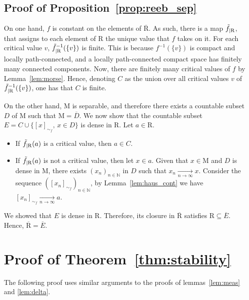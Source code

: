 \documentclass[pdflatex,sn-mathphys-ay]{sn-jnl}%
\newcommand{\reeb}{\mathrm{R}}
\newcommand{\man}{\mathrm{M}}
\newcommand{\converge}{\underset{n\rightarrow\infty}{\longrightarrow}}
\newcommand{\N}{\mathbb{N}}
\newcommand{\preim}[2]{#1^{-1}(#2)}
\newcommand{\change}[1]{\noindent #1}
\theoremstyle{thmstyleone}%
\begin{document}
\begin{appendices}
\subsection{Proof of Proposition~\ref{prop:reeb_sep}}

On one hand, $f$ is constant on the elements of $\overline{\reeb}$. As such, there is a map $\Tilde{f}_{|\reeb}$, that assigns to each element of $\reeb$ the unique value that $f$ takes on it. 
For each critical value $v$, $\preim{\Tilde{f}_{|\reeb}}{\{v\}}$ is finite. This is because $\preim{f}{\{v\}}$ is compact  and locally path-connected, and a locally path-connected compact space has finitely many connected components. 
Now, there are finitely many critical values of $f$ by Lemma~\ref{lem:morse}. Hence, denoting $C$ \change{as} the union over all critical values $v$ of $\preim{\Tilde{f}_{|\reeb}}{\{v\}}$, one has that $C$ is finite. 

On the other hand, $\man$ is separable, and therefore there exists a countable subset $D$ of $\man$ such that $\man=\overline{D}$. We now show that the countable subset $E=C\cup \{[x]_{\sim_f},\,x\in D\}$ is dense in $\reeb$. Let $a\in\reeb$. 
\begin{itemize}
	\item If $\Tilde{f}_{|\reeb}(a)$ is a critical value, then $a\in C$.
	\item If $\Tilde{f}_{|\reeb}(a)$ is not a critical value, then let $x\in a$. Given that $x\in\man$ and $D$ is dense in $\man$, there exists $(x_n)_{n\in\N}$ in $D$ such that $x_n\converge x$. Consider the sequence $([x_n]_{\sim_f})_{n\in\N}$, by Lemma~\ref{lem:haus_cont} we have $[x_n]_{\sim_f}\converge a$.
\end{itemize}  

We showed that $E$ is dense in $\reeb$. Therefore, its closure in $\overline{\reeb}$ satisfies $\reeb\subseteq\overline{E}$. Hence, $\overline{\reeb}=\overline{E}$.



\section{Proof of Theorem~\ref{thm:stability}}\label{apdx:stab_proof}

The following proof uses similar arguments to the proofs of lemmas~\ref{lem:meas} and \ref{lem:delta}.


\end{appendices}
\end{document}
